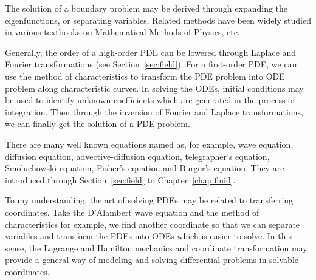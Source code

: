The solution of a boundary problem may be derived through expanding the eigenfunctions, or separating variables. Related methods have been widely studied in various textbooks on Mathematical Methods of Physics, etc. 

Generally, the order of a high-order PDE can be 
lowered through Laplace and Fourier transformations (see Section~\ref{sec:field}). For a first-order PDE, we can use the method of characteristics to transform the PDE problem into ODE problem along characteristic curves. In solving the ODEs, initial conditions may be used to identify unknown coefficients which are generated in the process of integration. Then through the inversion of Fourier and Laplace transformations, we can finally get the solution of a PDE problem. 

There are many well known equations named as, for example, wave equation, diffusion equation, advective-diffusion equation, telegrapher's equation, Smoluchowski equation, Fisher's equation and Burger's equation. They are introduced through Section~\ref{sec:field} to Chapter~\ref{chap:fluid}. 

To my understanding, the art of solving PDEs may be related to transferring coordinates. Take the D'Alambert wave equation and the method of characteristics for example, we find another coordinate so that we can separate variables and transform the PDEs into ODEs which is easier to solve. In this sense, the Lagrange and Hamilton mechanics and coordinate transformation may provide a general way of modeling and solving differential problems in solvable coordinates. 


%